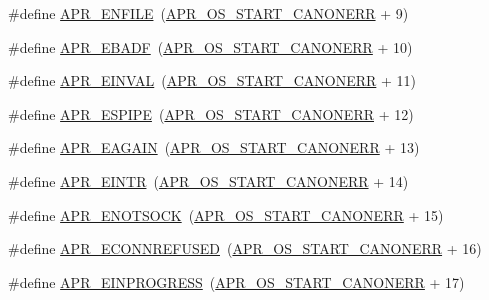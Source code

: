 \begin{DoxyCompactItemize}
\item 
\#define \hyperlink{group__APR__Error_gaf46f59147b00c2c87d76b9eb75674456}{A\+P\+R\+\_\+\+E\+N\+F\+I\+LE}~(\hyperlink{group__apr__errno_ga7bca957c11b80b31cb54b0d2cbe9e025}{A\+P\+R\+\_\+\+O\+S\+\_\+\+S\+T\+A\+R\+T\+\_\+\+C\+A\+N\+O\+N\+E\+RR} + 9)
\item 
\#define \hyperlink{group__APR__Error_ga204df8a37a5c7fd6b2c74ea098fbac02}{A\+P\+R\+\_\+\+E\+B\+A\+DF}~(\hyperlink{group__apr__errno_ga7bca957c11b80b31cb54b0d2cbe9e025}{A\+P\+R\+\_\+\+O\+S\+\_\+\+S\+T\+A\+R\+T\+\_\+\+C\+A\+N\+O\+N\+E\+RR} + 10)
\item 
\#define \hyperlink{group__APR__Error_gae3ffc41994444e71ce522c036ca1d9a4}{A\+P\+R\+\_\+\+E\+I\+N\+V\+AL}~(\hyperlink{group__apr__errno_ga7bca957c11b80b31cb54b0d2cbe9e025}{A\+P\+R\+\_\+\+O\+S\+\_\+\+S\+T\+A\+R\+T\+\_\+\+C\+A\+N\+O\+N\+E\+RR} + 11)
\item 
\#define \hyperlink{group__APR__Error_ga3be81035cd2da76fbc27c75496489359}{A\+P\+R\+\_\+\+E\+S\+P\+I\+PE}~(\hyperlink{group__apr__errno_ga7bca957c11b80b31cb54b0d2cbe9e025}{A\+P\+R\+\_\+\+O\+S\+\_\+\+S\+T\+A\+R\+T\+\_\+\+C\+A\+N\+O\+N\+E\+RR} + 12)
\item 
\#define \hyperlink{group__APR__Error_ga0b2a5ebb819de5ce93d326939b586578}{A\+P\+R\+\_\+\+E\+A\+G\+A\+IN}~(\hyperlink{group__apr__errno_ga7bca957c11b80b31cb54b0d2cbe9e025}{A\+P\+R\+\_\+\+O\+S\+\_\+\+S\+T\+A\+R\+T\+\_\+\+C\+A\+N\+O\+N\+E\+RR} + 13)
\item 
\#define \hyperlink{group__APR__Error_gaee1ce306c0ebf1701b34172310aa1bd5}{A\+P\+R\+\_\+\+E\+I\+N\+TR}~(\hyperlink{group__apr__errno_ga7bca957c11b80b31cb54b0d2cbe9e025}{A\+P\+R\+\_\+\+O\+S\+\_\+\+S\+T\+A\+R\+T\+\_\+\+C\+A\+N\+O\+N\+E\+RR} + 14)
\item 
\#define \hyperlink{group__APR__Error_gad456312527050c661dc19a8f17a0f0ef}{A\+P\+R\+\_\+\+E\+N\+O\+T\+S\+O\+CK}~(\hyperlink{group__apr__errno_ga7bca957c11b80b31cb54b0d2cbe9e025}{A\+P\+R\+\_\+\+O\+S\+\_\+\+S\+T\+A\+R\+T\+\_\+\+C\+A\+N\+O\+N\+E\+RR} + 15)
\item 
\#define \hyperlink{group__APR__Error_ga1b4d1d847bebdfc48af343bc2486ecb8}{A\+P\+R\+\_\+\+E\+C\+O\+N\+N\+R\+E\+F\+U\+S\+ED}~(\hyperlink{group__apr__errno_ga7bca957c11b80b31cb54b0d2cbe9e025}{A\+P\+R\+\_\+\+O\+S\+\_\+\+S\+T\+A\+R\+T\+\_\+\+C\+A\+N\+O\+N\+E\+RR} + 16)
\item 
\#define \hyperlink{group__APR__Error_ga5c311361f4f68f289c90f3cdfd77eb79}{A\+P\+R\+\_\+\+E\+I\+N\+P\+R\+O\+G\+R\+E\+SS}~(\hyperlink{group__apr__errno_ga7bca957c11b80b31cb54b0d2cbe9e025}{A\+P\+R\+\_\+\+O\+S\+\_\+\+S\+T\+A\+R\+T\+\_\+\+C\+A\+N\+O\+N\+E\+RR} + 17)

\end{DoxyCompactItemize}

